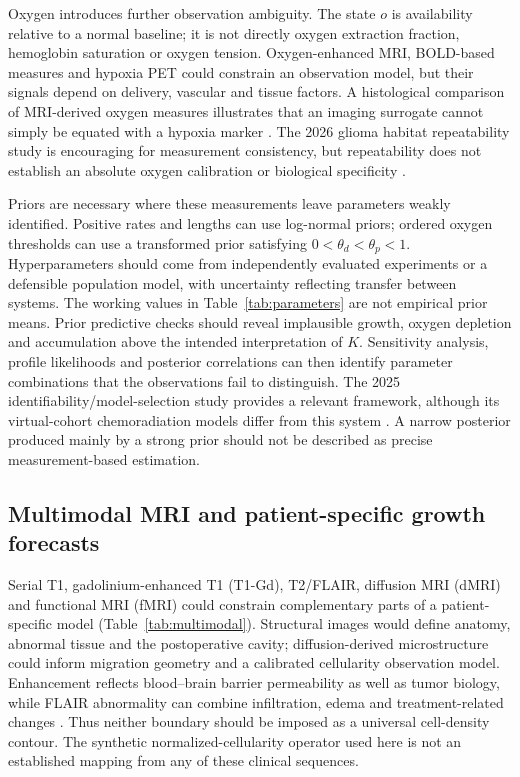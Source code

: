 Oxygen introduces further observation ambiguity. The state $o$ is availability relative to a normal baseline; it is not directly oxygen extraction fraction, hemoglobin saturation or oxygen tension. Oxygen-enhanced MRI, BOLD-based measures and hypoxia PET could constrain an observation model, but their signals depend on delivery, vascular and tissue factors. A histological comparison of MRI-derived oxygen measures illustrates that an imaging surrogate cannot simply be equated with a hypoxia marker \citep{arzanforoosh2024}. The 2026 glioma habitat repeatability study is encouraging for measurement consistency, but repeatability does not establish an absolute oxygen calibration or biological specificity \citep{das2026}.

Priors are necessary where these measurements leave parameters weakly identified. Positive rates and lengths can use log-normal priors; ordered oxygen thresholds can use a transformed prior satisfying $0<\theta_d<\theta_p<1$. Hyperparameters should come from independently evaluated experiments or a defensible population model, with uncertainty reflecting transfer between systems. The working values in Table~\ref{tab:parameters} are not empirical prior means. Prior predictive checks should reveal implausible growth, oxygen depletion and accumulation above the intended interpretation of $K$. Sensitivity analysis, profile likelihoods and posterior correlations can then identify parameter combinations that the observations fail to distinguish. The 2025 identifiability/model-selection study provides a relevant framework, although its virtual-cohort chemoradiation models differ from this system \citep{hiremath2025}. A narrow posterior produced mainly by a strong prior should not be described as precise measurement-based estimation.

\subsection{Multimodal MRI and patient-specific growth forecasts}
Serial T1, gadolinium-enhanced T1 (T1-Gd), T2/FLAIR, diffusion MRI (dMRI) and functional MRI (fMRI) could constrain complementary parts of a patient-specific model (Table~\ref{tab:multimodal}). Structural images would define anatomy, abnormal tissue and the postoperative cavity; diffusion-derived microstructure could inform migration geometry and a calibrated cellularity observation model. Enhancement reflects blood--brain barrier permeability as well as tumor biology, while FLAIR abnormality can combine infiltration, edema and treatment-related changes \citep{wen2023,martens2021}. Thus neither boundary should be imposed as a universal cell-density contour. The synthetic normalized-cellularity operator used here is not an established mapping from any of these clinical sequences.

